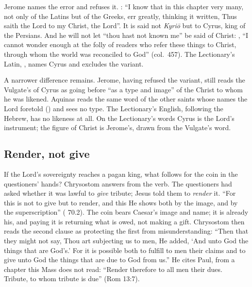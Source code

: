 Jerome names the error and refuses it. : ``I know that in this chapter
very many, not only of the Latins but of the Greeks, err greatly, thinking it
written, Thus saith the Lord to my Christ, the Lord''. It is said not
\textit{Kyri\=o} but to Cyrus, king of the Persians. And he will not let ``thou
hast not known me'' be said of Christ: , ``I cannot wonder enough at the folly of readers who
refer these things to Christ, through whom the world was reconciled to God''
(col.~457). The Lectionary's Latin, , names Cyrus and
excludes the variant.

A narrower difference remains. Jerome, having refused the variant, still reads
the Vulgate's  of Cyrus as going before ``as a type and
image'' of the Christ to whom he was likened. Aquinas reads the same word of
the other saints whose names the Lord foretold () and sees no type.
The Lectionary's English, following the Hebrew, has no likeness at all. On
the Lectionary's words Cyrus is the Lord's instrument; the figure of Christ is
Jerome's, drawn from the Vulgate's word.

\subsection{Render, not give}

If the Lord's sovereignty reaches a pagan king, what follows for the coin in
the questioners' hands? Chrysostom answers from the verb. The questioners had
asked whether it was lawful to \emph{give} tribute; Jesus told them to
\emph{render} it. ``For this is not to give but to render, and this He shows
both by the image, and by the superscription'' (
70.2). The coin bears Caesar's image and name; it is already his, and paying it
is returning what is owed, not making a gift. Chrysostom then reads the second
clause as protecting the first from misunderstanding: ``Then that they might
not say, Thou art subjecting us to men, He added, `And unto God the things
that are God's.' For it is possible both to fulfill to men their claims and to
give unto God the things that are due to God from us.'' He cites Paul, from a
chapter this Mass does not read: ``Render therefore to all men their dues. Tribute, to whom tribute is due''
(Rom 13:7).

